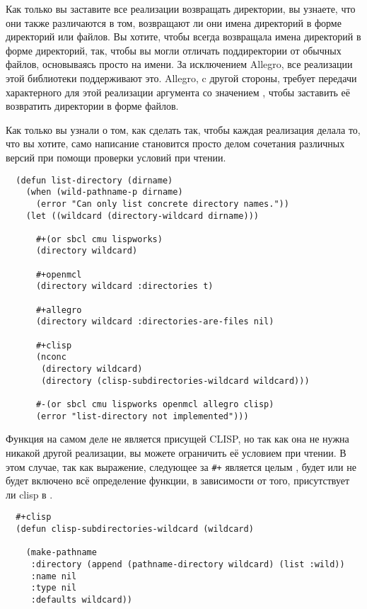 Как только вы заставите все реализации возвращать директории, вы узнаете, что они также
различаются в том, возвращают ли они имена директорий в форме директорий или файлов. Вы
хотите, чтобы  всегда возвращала имена директорий в форме директорий,
так, чтобы вы могли отличать поддиректории от обычных файлов, основываясь просто на
имени. За исключением Allegro, все реализации этой библиотеки поддерживают это.  Allegro,
c другой стороны, требует передачи  характерного для этой реализации
аргумента  со значением , чтобы заставить её
возвратить директории в форме файлов.

Как только вы узнали о том, как сделать так, чтобы каждая реализация делала то, что вы
хотите, само написание  становится просто делом сочетания различных
версий при помощи проверки условий при чтении.

\begin{lstlisting}
  (defun list-directory (dirname)
    (when (wild-pathname-p dirname)
      (error "Can only list concrete directory names."))
    (let ((wildcard (directory-wildcard dirname)))

      #+(or sbcl cmu lispworks)
      (directory wildcard)

      #+openmcl
      (directory wildcard :directories t)

      #+allegro
      (directory wildcard :directories-are-files nil)

      #+clisp
      (nconc
       (directory wildcard)
       (directory (clisp-subdirectories-wildcard wildcard)))

      #-(or sbcl cmu lispworks openmcl allegro clisp)
      (error "list-directory not implemented")))
\end{lstlisting}

Функция  на самом деле не является присущей CLISP, но
так как она не нужна никакой другой реализации, вы можете ограничить её условием при
чтении. В этом случае, так как выражение, следующее за \lstinline!#+! является целым
, будет или не будет включено всё определение функции, в зависимости от того,
присутствует ли clisp в .

\begin{lstlisting}
  #+clisp
  (defun clisp-subdirectories-wildcard (wildcard)

    (make-pathname
     :directory (append (pathname-directory wildcard) (list :wild))
     :name nil
     :type nil
     :defaults wildcard))
\end{lstlisting}

